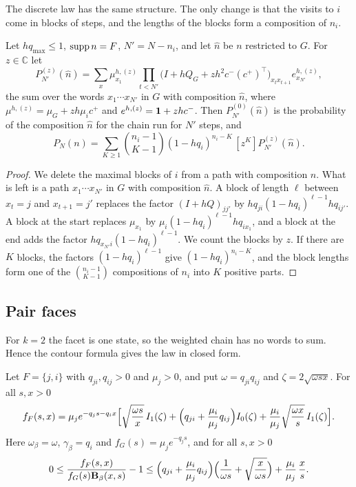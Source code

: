 The discrete law has the same structure. The only change is that the visits to $i$ come in
blocks of steps, and the lengths of the blocks form a composition of $n_i$.

\begin{lemma}\label{lem:layer-exact-discrete}
Let $hq_{\max}\le1$, $\operatorname{supp} n=F$, $N'=N-n_i$, and let $\hat n$ be $n$ restricted to $G$. For
$z\in\mathbb C$ let
\[
P^{(z)}_{N'}(\hat n)=\sum_{x}\mu^{h,(z)}_{x_1}\prod_{t<N'}\bigl(I+hQ_G+zh^2c^-(c^+)^\top\bigr)_{x_tx_{t+1}}e^{h,(z)}_{x_{N'}},
\]
the sum over the words $x_1\cdots x_{N'}$ in $G$ with composition $\hat n$, where
$\mu^{h,(z)}=\mu_G+zh\mu_ic^+$ and $e^{h,(z)}=\mathbf{1}+zhc^-$. Then $P^{(0)}_{N'}(\hat n)$ is the
probability of the composition $\hat n$ for the chain run for $N'$ steps, and
\[
P_N(n)=\sum_{K\ge1}\binom{n_i-1}{K-1}(1-hq_i)^{n_i-K}\,[z^K]P^{(z)}_{N'}(\hat n).
\]
\end{lemma}

\begin{proof}
We delete the maximal blocks of $i$ from a path with composition $n$. What is left is a path
$x_1\cdots x_{N'}$ in $G$ with composition $\hat n$. A block of length $\ell$ between
$x_t=j$ and $x_{t+1}=j'$ replaces the factor $(I+hQ)_{jj'}$ by
$hq_{ji}(1-hq_i)^{\ell-1}hq_{ij'}$. A block at the start replaces $\mu_{x_1}$ by
$\mu_i(1-hq_i)^{\ell-1}hq_{ix_1}$, and a block at the end adds the factor
$hq_{x_{N'}i}(1-hq_i)^{\ell-1}$. We count the blocks by $z$. If there are $K$ blocks, the
factors $(1-hq_i)^{\ell-1}$ give $(1-hq_i)^{n_i-K}$, and the block lengths form one of the
$\binom{n_i-1}{K-1}$ compositions of $n_i$ into $K$ positive parts.
\end{proof}

\subsection{Pair faces}\label{sec:layer-pair}

For $k=2$ the facet is one state, so the weighted chain has no words to sum. Hence the contour
formula gives the law in closed form.

\begin{proposition}\label{prop:pair-face}
Let $F=\{j,i\}$ with $q_{ji},q_{ij}>0$ and $\mu_j>0$, and put $\omega=q_{ji}q_{ij}$ and
$\zeta=2\sqrt{\omega sx}$. For all $s,x>0$
\[
f_F(s,x)=\mu_je^{-q_js-q_ix}\Bigl[\sqrt{\frac{\omega s}x}\,I_1(\zeta)+\Bigl(q_{ji}+\frac{\mu_i}{\mu_j}q_{ij}\Bigr)I_0(\zeta)
+\frac{\mu_i}{\mu_j}\sqrt{\frac{\omega x}s}\,I_1(\zeta)\Bigr].
\]
Here $\omega_\beta=\omega$, $\gamma_\beta=q_i$ and $f_G(s)=\mu_je^{-q_js}$, and for all
$s,x>0$
\[
0\le\frac{f_F(s,x)}{f_G(s)\mathbf B_\beta(x,s)}-1\le\Bigl(q_{ji}+\frac{\mu_i}{\mu_j}q_{ij}\Bigr)\Bigl(\frac1{\omega s}+\sqrt{\frac x{\omega s}}\Bigr)+\frac{\mu_i}{\mu_j}\,\frac xs .
\]
\end{proposition}


